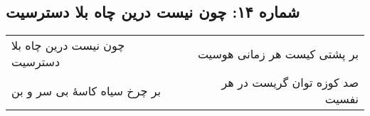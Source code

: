 \begin{center}
\section*{شماره ۱۴: چون نیست درین چاه بلا دسترسیت}
\label{sec:014}
\begin{longtable}{l p{0.5cm} r}
چون نیست درین چاه بلا دسترسیت
&&
بر پشتی کیست هر زمانی هوسیت
\\
بر چرخ سیاه کاسهٔ بی سر و بن
&&
صد کوزه توان گریست در هر نفسیت
\\
\end{longtable}
\end{center}
